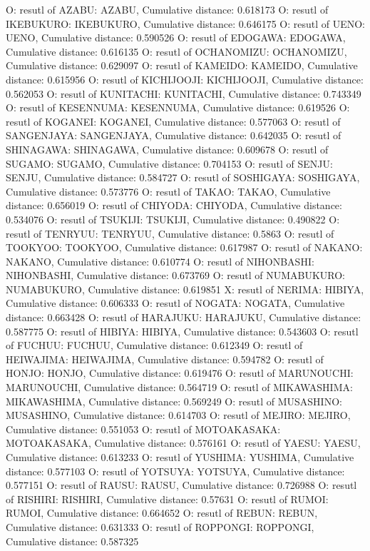 O: resutl of AZABU: AZABU, Cumulative distance: 0.618173
O: resutl of IKEBUKURO: IKEBUKURO, Cumulative distance: 0.646175
O: resutl of UENO: UENO, Cumulative distance: 0.590526
O: resutl of EDOGAWA: EDOGAWA, Cumulative distance: 0.616135
O: resutl of OCHANOMIZU: OCHANOMIZU, Cumulative distance: 0.629097
O: resutl of KAMEIDO: KAMEIDO, Cumulative distance: 0.615956
O: resutl of KICHIJOOJI: KICHIJOOJI, Cumulative distance: 0.562053
O: resutl of KUNITACHI: KUNITACHI, Cumulative distance: 0.743349
O: resutl of KESENNUMA: KESENNUMA, Cumulative distance: 0.619526
O: resutl of KOGANEI: KOGANEI, Cumulative distance: 0.577063
O: resutl of SANGENJAYA: SANGENJAYA, Cumulative distance: 0.642035
O: resutl of SHINAGAWA: SHINAGAWA, Cumulative distance: 0.609678
O: resutl of SUGAMO: SUGAMO, Cumulative distance: 0.704153
O: resutl of SENJU: SENJU, Cumulative distance: 0.584727
O: resutl of SOSHIGAYA: SOSHIGAYA, Cumulative distance: 0.573776
O: resutl of TAKAO: TAKAO, Cumulative distance: 0.656019
O: resutl of CHIYODA: CHIYODA, Cumulative distance: 0.534076
O: resutl of TSUKIJI: TSUKIJI, Cumulative distance: 0.490822
O: resutl of TENRYUU: TENRYUU, Cumulative distance: 0.5863
O: resutl of TOOKYOO: TOOKYOO, Cumulative distance: 0.617987
O: resutl of NAKANO: NAKANO, Cumulative distance: 0.610774
O: resutl of NIHONBASHI: NIHONBASHI, Cumulative distance: 0.673769
O: resutl of NUMABUKURO: NUMABUKURO, Cumulative distance: 0.619851
X: resutl of NERIMA: HIBIYA, Cumulative distance: 0.606333
O: resutl of NOGATA: NOGATA, Cumulative distance: 0.663428
O: resutl of HARAJUKU: HARAJUKU, Cumulative distance: 0.587775
O: resutl of HIBIYA: HIBIYA, Cumulative distance: 0.543603
O: resutl of FUCHUU: FUCHUU, Cumulative distance: 0.612349
O: resutl of HEIWAJIMA: HEIWAJIMA, Cumulative distance: 0.594782
O: resutl of HONJO: HONJO, Cumulative distance: 0.619476
O: resutl of MARUNOUCHI: MARUNOUCHI, Cumulative distance: 0.564719
O: resutl of MIKAWASHIMA: MIKAWASHIMA, Cumulative distance: 0.569249
O: resutl of MUSASHINO: MUSASHINO, Cumulative distance: 0.614703
O: resutl of MEJIRO: MEJIRO, Cumulative distance: 0.551053
O: resutl of MOTOAKASAKA: MOTOAKASAKA, Cumulative distance: 0.576161
O: resutl of YAESU: YAESU, Cumulative distance: 0.613233
O: resutl of YUSHIMA: YUSHIMA, Cumulative distance: 0.577103
O: resutl of YOTSUYA: YOTSUYA, Cumulative distance: 0.577151
O: resutl of RAUSU: RAUSU, Cumulative distance: 0.726988
O: resutl of RISHIRI: RISHIRI, Cumulative distance: 0.57631
O: resutl of RUMOI: RUMOI, Cumulative distance: 0.664652
O: resutl of REBUN: REBUN, Cumulative distance: 0.631333
O: resutl of ROPPONGI: ROPPONGI, Cumulative distance: 0.587325
